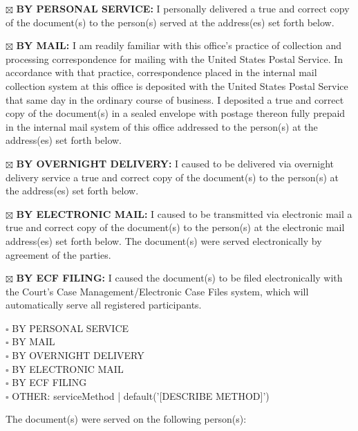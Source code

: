{%
$\boxtimes$ \textbf{BY PERSONAL SERVICE:} I personally delivered a true and correct copy of the document(s) to the person(s) served at the address(es) set forth below.

{%
$\boxtimes$ \textbf{BY MAIL:} I am readily familiar with this office's practice of collection and processing correspondence for mailing with the United States Postal Service. In accordance with that practice, correspondence placed in the internal mail collection system at this office is deposited with the United States Postal Service that same day in the ordinary course of business. I deposited a true and correct copy of the document(s) in a sealed envelope with postage thereon fully prepaid in the internal mail system of this office addressed to the person(s) at the address(es) set forth below.

{%
$\boxtimes$ \textbf{BY OVERNIGHT DELIVERY:} I caused to be delivered via overnight delivery service a true and correct copy of the document(s) to the person(s) at the address(es) set forth below.

{%
$\boxtimes$ \textbf{BY ELECTRONIC MAIL:} I caused to be transmitted via electronic mail a true and correct copy of the document(s) to the person(s) at the electronic mail address(es) set forth below. The document(s) were served electronically by agreement of the parties.

{%
$\boxtimes$ \textbf{BY ECF FILING:} I caused the document(s) to be filed electronically with the Court's Case Management/Electronic Case Files system, which will automatically serve all registered participants.

{%
$\square$ BY PERSONAL SERVICE\\
$\square$ BY MAIL\\
$\square$ BY OVERNIGHT DELIVERY\\
$\square$ BY ELECTRONIC MAIL\\
$\square$ BY ECF FILING\\
$\square$ OTHER: {{ serviceMethod | default('[DESCRIBE METHOD]') }}
{%

\vspace{0.25in}

The document(s) were served on the following person(s):

\vspace{0.25in}

}}}}}}}
